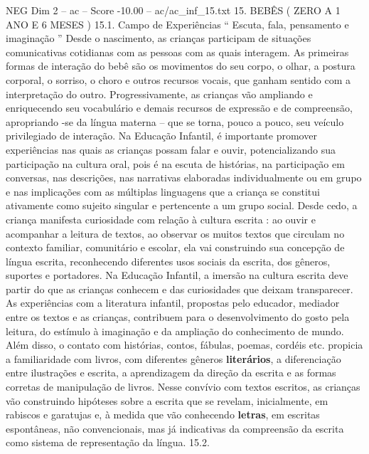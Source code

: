 \begin{textsample}{NEG Dim 2 – ac – Score -10.00 – ac/ac\_inf\_15.txt}  \label{ex:f2_neg_121}
15.
BEBÊS ( ZERO A 1 ANO E 6 MESES ) 15.1.
Campo de Experiências “ Escuta, fala, pensamento e imaginação ” Desde o nascimento, as crianças participam de situações comunicativas cotidianas com as pessoas com as quais interagem.
As primeiras formas de interação do bebê são os movimentos do seu corpo, o olhar, a postura corporal, o sorriso, o choro e outros recursos vocais, que ganham sentido com a interpretação do outro.
Progressivamente, as crianças vão ampliando e enriquecendo seu vocabulário e demais recursos de expressão e de compreensão, apropriando -se da língua materna – que se torna, pouco a pouco, seu veículo privilegiado de interação.
Na Educação Infantil, é importante promover experiências nas quais as crianças possam falar e ouvir, potencializando sua participação na cultura oral, pois é na escuta de histórias, na participação em conversas, nas descrições, nas narrativas elaboradas individualmente ou em grupo e nas implicações com as múltiplas linguagens que a criança se constitui ativamente como sujeito singular e pertencente a um grupo social.
Desde cedo, a criança manifesta curiosidade com relação à cultura escrita : ao ouvir e acompanhar a leitura de textos, ao observar os muitos textos que circulam no contexto familiar, comunitário e escolar, ela vai construindo sua concepção de língua escrita, reconhecendo diferentes usos sociais da escrita, dos gêneros, suportes e portadores.
Na Educação Infantil, a imersão na cultura escrita deve partir do que as crianças conhecem e das curiosidades que deixam transparecer.
As experiências com a literatura infantil, propostas pelo educador, mediador entre os textos e as crianças, contribuem para o desenvolvimento do gosto pela leitura, do estímulo à imaginação e da ampliação do conhecimento de mundo.
Além disso, o contato com histórias, contos, fábulas, poemas, cordéis etc. propicia a familiaridade com livros, com diferentes gêneros \textbf{literários}, a diferenciação entre ilustrações e escrita, a aprendizagem da direção da escrita e as formas corretas de manipulação de livros.
Nesse convívio com textos escritos, as crianças vão construindo hipóteses sobre a escrita que se revelam, inicialmente, em rabiscos e garatujas e, à medida que vão conhecendo \textbf{letras}, em escritas espontâneas, não convencionais, mas já indicativas da compreensão da escrita como sistema de representação da língua. 15.2.

\end{textsample}

